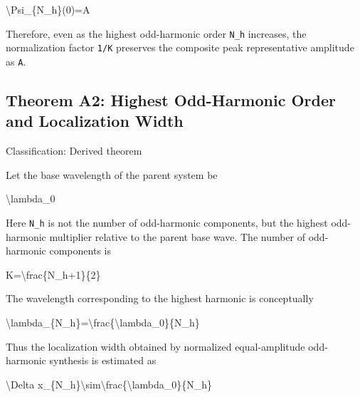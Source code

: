 \documentclass[
  a4paper,
]{article}
\newenvironment{Shaded}{}{}
\newcommand{\NormalTok}[1]{#1}
\begin{document}
\begin{Shaded}
\begin{Highlighting}[]
\NormalTok{\textbackslash{}Psi\_\{N\_h\}(0)=A}
\end{Highlighting}
\end{Shaded}

Therefore, even as the highest odd-harmonic order \texttt{N\_h}
increases, the normalization factor \texttt{1/K} preserves the composite
peak representative amplitude as \texttt{A}.

\subsection{Theorem A2: Highest Odd-Harmonic Order and Localization
Width}\label{theorem-a2-highest-odd-harmonic-order-and-localization-width}

Classification: Derived theorem

Let the base wavelength of the parent system be

\begin{Shaded}
\begin{Highlighting}[]
\NormalTok{\textbackslash{}lambda\_0}
\end{Highlighting}
\end{Shaded}

Here \texttt{N\_h} is not the number of odd-harmonic components, but the
highest odd-harmonic multiplier relative to the parent base wave. The
number of odd-harmonic components is

\begin{Shaded}
\begin{Highlighting}[]
\NormalTok{K=\textbackslash{}frac\{N\_h+1\}\{2\}}
\end{Highlighting}
\end{Shaded}

The wavelength corresponding to the highest harmonic is conceptually

\begin{Shaded}
\begin{Highlighting}[]
\NormalTok{\textbackslash{}lambda\_\{N\_h\}=\textbackslash{}frac\{\textbackslash{}lambda\_0\}\{N\_h\}}
\end{Highlighting}
\end{Shaded}

Thus the localization width obtained by normalized equal-amplitude
odd-harmonic synthesis is estimated as

\begin{Shaded}
\begin{Highlighting}[]
\NormalTok{\textbackslash{}Delta x\_\{N\_h\}\textbackslash{}sim\textbackslash{}frac\{\textbackslash{}lambda\_0\}\{N\_h\}}
\end{Highlighting}
\end{Shaded}
\end{document}

